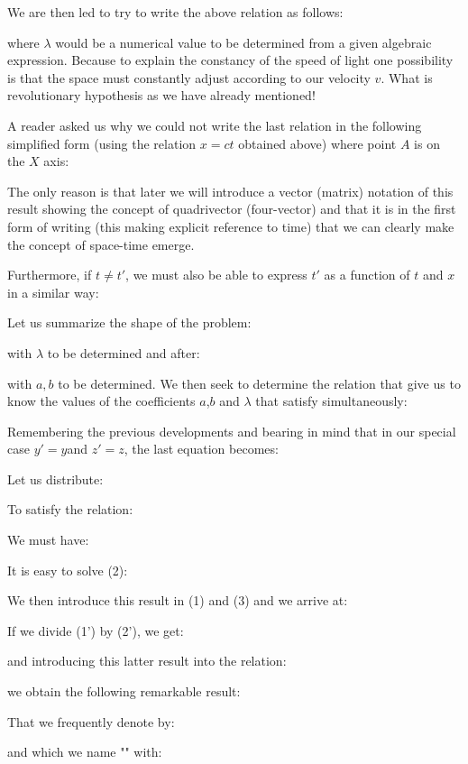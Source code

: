 		We are then led to try to write the above relation as follows:
		
		where $\lambda$ would be a numerical value to be determined from a given algebraic expression. Because to explain the constancy of the speed of light one possibility is that the space must constantly adjust according to our velocity $v$. What is revolutionary hypothesis as we have already mentioned!
	\begin{tcolorbox}[title=Remark,colframe=black,arc=10pt]
	A reader asked us why we could not write the last relation in the following simplified form (using the relation $x = ct$ obtained above) where point $A$ is on the $X$ axis:
	
	The only reason is that later we will introduce a vector (matrix) notation of this result showing the concept of quadrivector (four-vector) and that it is in the first form of writing (this making explicit reference to time) that we can clearly make the concept of space-time emerge.
	\end{tcolorbox}
	Furthermore, if $t\neq t'$, we must also be able to express $t'$ as a function of $t$ and $x$ in a similar way:
	
	Let us summarize the shape of the problem:
	
	with $\lambda$ to be determined and after:
	
	with $a,b$ to be determined.
	We then seek to determine the relation that give us to know the values of the coefficients $a$,$b$ and $\lambda$ that satisfy simultaneously:
	
	Remembering the previous developments and bearing in mind that in our special case $y '= y $and $z' = z$, the last equation becomes:
	
	Let us distribute:
	
	To satisfy the relation:
	
	We must have:
	
	It is easy to solve (2):
	
	We then introduce this result in (1) and (3) and we arrive at:
	
	If we divide (1') by (2'), we get:
	
	and introducing this latter result into the relation:
	
	we obtain the following remarkable result:
	
	That we frequently denote by:
	
	and which we name "" with:
	
